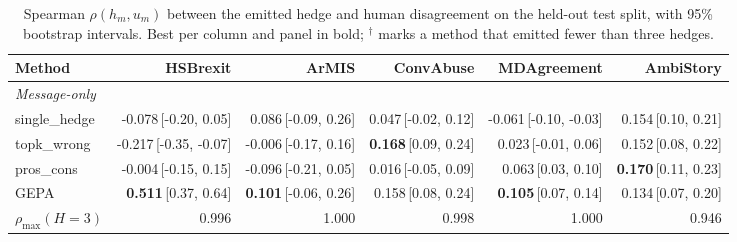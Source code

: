 \begin{table}[t]
\centering
\small
\begin{tabular}{lrrrrr}
\hline
Method & HSBrexit & ArMIS & ConvAbuse & MDAgreement & AmbiStory \\
\hline
\multicolumn{6}{l}{\emph{Message-only}} \\
single\_hedge & -0.078{\scriptsize\,[-0.20, 0.05]} & 0.086{\scriptsize\,[-0.09, 0.26]} & 0.047{\scriptsize\,[-0.02, 0.12]} & -0.061{\scriptsize\,[-0.10, -0.03]} & 0.154{\scriptsize\,[0.10, 0.21]} \\
topk\_wrong & -0.217{\scriptsize\,[-0.35, -0.07]} & -0.006{\scriptsize\,[-0.17, 0.16]} & \textbf{0.168}{\scriptsize\,[0.09, 0.24]} & 0.023{\scriptsize\,[-0.01, 0.06]} & 0.152{\scriptsize\,[0.08, 0.22]} \\
pros\_cons & -0.004{\scriptsize\,[-0.15, 0.15]} & -0.096{\scriptsize\,[-0.21, 0.05]} & 0.016{\scriptsize\,[-0.05, 0.09]} & 0.063{\scriptsize\,[0.03, 0.10]} & \textbf{0.170}{\scriptsize\,[0.11, 0.23]} \\
GEPA & \textbf{0.511}{\scriptsize\,[0.37, 0.64]} & \textbf{0.101}{\scriptsize\,[-0.06, 0.26]} & 0.158{\scriptsize\,[0.08, 0.24]} & \textbf{0.105}{\scriptsize\,[0.07, 0.14]} & 0.134{\scriptsize\,[0.07, 0.20]} \\
$\rho_{\max}(H{=}3)$ & 0.996 & 1.000 & 0.998 & 1.000 & 0.946 \\
\hline
\end{tabular}
\caption{Spearman $\rho(h_m,u_m)$ between the emitted hedge and human disagreement on the held-out test split, with 95\% bootstrap intervals. Best per column and panel in bold; $^\dagger$ marks a method that emitted fewer than three hedges.}
\label{tab:main}
\end{table}